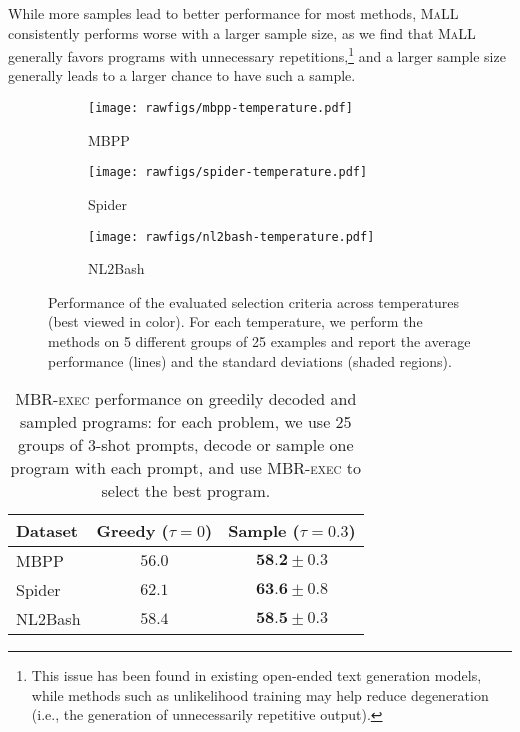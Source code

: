 \documentclass[11pt]{article}
\newcommand{\mbrexec}{\textsc{MBR-exec}\xspace}
\newcommand{\maxavglikelihood}{\textsc{MaLL}\xspace}
\begin{document}
While more samples lead to better performance for most methods, \maxavglikelihood consistently performs worse with a larger sample size, as we find that \maxavglikelihood generally favors programs with unnecessary repetitions,\footnote{This issue has been found in existing open-ended text generation models, while methods such as unlikelihood training \citep{Welleck2020Neural} may help reduce degeneration (i.e., the generation of unnecessarily repetitive output).} and a larger sample size generally leads to a larger chance to have such a sample.
 \begin{figure*}[t]
    \centering
    \begin{subfigure}[t]{0.34\textwidth}
        \texttt{[image: rawfigs/mbpp-temperature.pdf]}
        \caption{MBPP}
    \end{subfigure}
    \hspace{-10pt}
    \begin{subfigure}[t]{0.34\textwidth}
        \texttt{[image: rawfigs/spider-temperature.pdf]}
        \caption{Spider}
    \end{subfigure}
    \hspace{-10pt}
    \begin{subfigure}[t]{0.34\textwidth}
        \texttt{[image: rawfigs/nl2bash-temperature.pdf]}
        \caption{NL2Bash}
    \end{subfigure}
    \caption{Performance of the evaluated selection criteria across temperatures (best viewed in color). For each temperature, we perform the methods on 5 different groups of 25 examples and report the average performance (lines) and the standard deviations (shaded regions).}
    \label{fig:temperature}
\end{figure*} \begin{table}[t]
\centering
\small
\begin{tabular}{lcc}
    \toprule
    \textbf{Dataset} & \textbf{Greedy ($\tau=0$)} & \textbf{Sample ($\tau=0.3$)} \\
    \midrule
    MBPP    & $56.0$    &  $\textbf{58.2}\pm0.3$\\
    Spider  & $62.1$    &  $\textbf{63.6}\pm0.8$\\
    NL2Bash & $58.4$    &  $\textbf{58.5}\pm0.3$\\
    \bottomrule
\end{tabular}
\caption{
    \label{tab:0.3-vs-greedy} \mbrexec performance on greedily decoded and sampled programs: for each problem, we use 25 groups of 3-shot prompts, decode or sample one program with each prompt, and use \mbrexec to select the best program.
}
\end{table}
\end{document}
